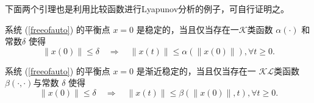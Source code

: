 下面两个引理也是利用比较函数进行Lyapunov分析的例子，可自行证明之。
\begin{lemma}
  系统 (\ref{freeofauto}) 的平衡点 $x = 0$ 是稳定的，当且仅当存在一$\mathcal{K}$类函数 $\alpha (\cdot)$
  和常数$\delta$ 使得
  \[ \| x (0) \| \leq \delta \quad \Rightarrow \quad \| x (t) \| \leq \alpha
     (\| x (0) \|), \forall t \geq 0. \]
\end{lemma}

\begin{lemma}
  系统 (\ref{freeofauto}) 的平衡点 $x = 0$ 是渐近稳定的，当且仅当存在一
  $\mathcal{K}\mathcal{L}$类函数 $\beta (\cdot,\cdot)$与常数 $\delta$
  使得
  \[ \| x (0) \| \leq \delta \quad \Rightarrow \quad \| x (t) \| \leq \beta
     (\| x (0) \|, t), \forall t \geq 0. \]
\end{lemma}